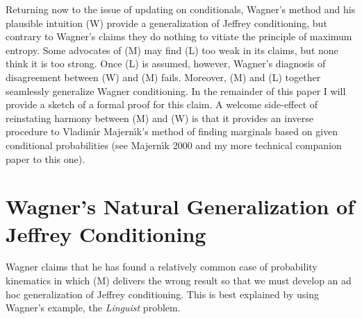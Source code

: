 \documentclass[11pt]{article}
\begin{document}


Returning now to the issue of updating on conditionals, Wagner's
method and his plausible intuition (W) provide a generalization of
Jeffrey conditioning, but contrary to Wagner's claims they do nothing
to vitiate the principle of maximum entropy. Some advocates of (M) may
find (L) too weak in its claims, but none think it is too strong. Once
(L) is assumed, however, Wagner's diagnosis of disagreement between
(W) and (M) fails. Moreover, (M) and (L) together seamlessly
generalize Wagner conditioning. In the remainder of this paper I will
provide a sketch of a formal proof for this claim. A welcome
side-effect of reinstating harmony between (M) and (W) is that it
provides an inverse procedure to Vladim{\'\i}r Majern{\'\i}k's method
of finding marginals based on given conditional probabilities (see
Majern{\'\i}k 2000 and my more technical companion paper to this
one).

\section{Wagner's Natural Generalization of Jeffrey Conditioning}
\label{NatGen}

Wagner claims that he has found a relatively common case of
probability kinematics in which (M) delivers the wrong result so that
we must develop an ad hoc generalization of Jeffrey conditioning. This
is best explained by using Wagner's example, the \emph{Linguist}
problem.
\end{document}
